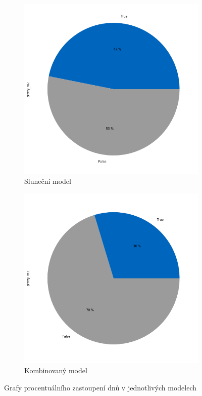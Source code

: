 \documentclass[12pt]{report}
\begin{document}
\begin{figure}
\begin{subfigure}{.33\textwidth}
        \includegraphics[width=\linewidth]{m2_pie.png}
        \caption{Sluneční model}
        \label{fig:sfig2}
    \end{subfigure}
    \begin{subfigure}{.33\textwidth}
        \centering
        \includegraphics[width=\linewidth]{m3_pie.png}
        \caption{Kombinovaný model}
        \label{fig:sfig2}
    \end{subfigure}
    \caption{Grafy procentuálního zastoupení  dnů v jednotlivých modelech}
    \label{fig:wmodels}
\end{figure}
\end{document}
